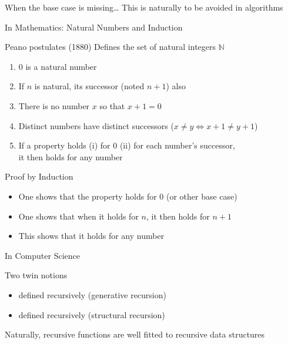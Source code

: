 \begin{Coupe}
\begin{frame}{When the base case is missing\ldots}
  \bigskip This is naturally to be avoided in algorithms
\end{frame}
\begin{frame}{In Mathematics: Natural Numbers and Induction}
  \begin{block}{Peano postulates (1880)}\medskip
    Defines the set of natural integers $\mathbb{N}$
    \begin{enumerate}
    \item 0 is a natural number
    \item If $n$ is natural, its successor (noted $n+1$) also
    \item There is no number $x$ so that $x+1=0$
    \item Distinct numbers have distinct successors ($x\neq y
      \Leftrightarrow x+1\neq y+1$)
    \item If a property holds (i) for 0 (ii) for each number's successor, \\
      it then holds for any number
    \end{enumerate}
  \end{block}

  \begin{block}{Proof by Induction}
    \begin{itemize}
    \item One shows that the property holds for 0 (or other base case)
    \item One shows that \alert{when} it holds for $n$, it \alert{then} holds
      for $n+1$
    \item This shows that it holds for any number
    \end{itemize}
  \end{block}
\end{frame}
\begin{frame}{In Computer Science}

  \begin{block}{Two twin notions}
    \begin{itemize}\large
    \item {} defined recursively (generative
      recursion) 
    \item {} defined recursively (structural recursion)
    \end{itemize}    

    Naturally, recursive functions are well fitted to recursive data structures
  \end{block}\bigskip


\end{frame}
\end{Coupe}

